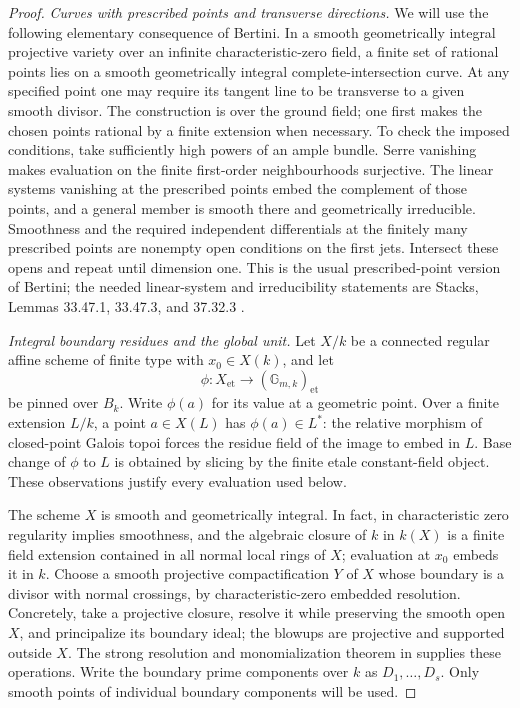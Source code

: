 \begin{proof}
\emph{Curves with prescribed points and transverse directions.}
We will use the following elementary consequence of Bertini. In a
smooth geometrically integral projective variety over an infinite
characteristic-zero field, a finite set of rational points lies on a
smooth geometrically integral complete-intersection curve. At any
specified point one may require its tangent line to be transverse to
a given smooth divisor. The construction is over the ground field;
one first makes the chosen points rational by a finite extension when
necessary. To check the imposed conditions, take sufficiently high
powers of an ample bundle. Serre vanishing makes evaluation on the
finite first-order neighbourhoods surjective. The linear systems
vanishing at the prescribed points embed the complement of those
points, and a general member is smooth there and geometrically
irreducible. Smoothness and the required independent differentials at
the finitely many prescribed points are nonempty open conditions on
the first jets. Intersect these opens and repeat until dimension one.
This is the usual prescribed-point version of Bertini; the needed
linear-system and irreducibility statements are Stacks, Lemmas
33.47.1, 33.47.3, and 37.32.3 \citep{FA_StacksBertini}.

\emph{Integral boundary residues and the global unit.}
Let $X/k$ be a connected regular affine scheme of finite type with
$x_0\in X(k)$, and let
\[
       \phi:X_{\mathrm{et}}\longrightarrow
                        (\mathbb G_{m,k})_{\mathrm{et}}
\]
be pinned over $B_k$. Write $\phi(a)$ for its value at a geometric
point. Over a finite extension $L/k$, a point $a\in X(L)$ has
$\phi(a)\in L^*$: the relative morphism of closed-point Galois topoi
forces the residue field of the image to embed in $L$. Base change of
$\phi$ to $L$ is obtained by slicing by the finite etale constant-field
object. These observations justify every evaluation used below.

The scheme $X$ is smooth and geometrically integral. In fact, in
characteristic zero regularity implies smoothness, and the algebraic
closure of $k$ in $k(X)$ is a finite field extension contained in all
normal local rings of $X$; evaluation at $x_0$ embeds it in $k$.
Choose a smooth projective compactification $Y$ of $X$ whose boundary
is a divisor with normal crossings, by characteristic-zero embedded
resolution. Concretely, take a projective closure, resolve it while
preserving the smooth open $X$, and principalize its boundary ideal;
the blowups are projective and supported outside $X$. The strong
resolution and monomialization theorem in
\cite[``The result'' and ``Idea of proof'', pp.~1--3]{FA_EncinasHauser2002}
supplies these operations. Write the boundary prime components over
$k$ as $D_1,\ldots,D_s$.
Only smooth points of individual boundary components will be used.


\end{proof}

